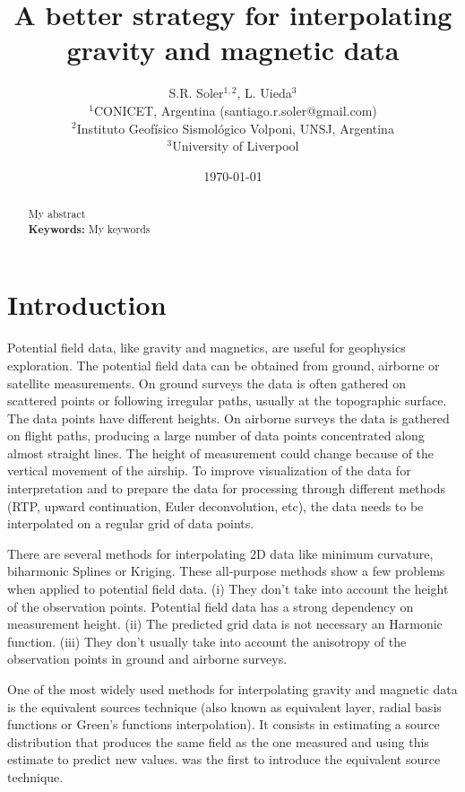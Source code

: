 \documentclass[twocolumn]{article}
\makeatletter
\newcommand{\Title}{A better strategy for interpolating gravity and magnetic data}
\newcommand{\AuthorAffil}{
    {\large
        S.R. Soler$^{1,2}$,
        L. Uieda$^{3}$
    }
    \\[0.4cm]
    {\small $^{1}$CONICET, Argentina (santiago.r.soler@gmail.com)} \\
    {\small $^{2}$Instituto Geofísico Sismológico Volponi, UNSJ, Argentina} \\
    {\small $^{3}$University of Liverpool} \\

}
\makeatother
\begin{document}
\title{\Title}
\author{\AuthorAffil}
\date{
    \normalsize
    \today
}
\maketitle

\begin{abstract}
    My abstract
    \\[0.5cm]
    \textbf{Keywords:}
    My keywords
\end{abstract}


\section{Introduction}

Potential field data, like gravity and magnetics, are useful for geophysics exploration.
The potential field data can be obtained from ground, airborne or satellite
measurements.
On ground surveys the data is often gathered on scattered points or following irregular
paths, usually at the topographic surface.
The data points have different heights.
On airborne surveys the data is gathered on flight paths, producing a large number of
data points concentrated along almost straight lines.
The height of measurement could change because of the vertical movement of the airship.
To improve visualization of the data for interpretation and to prepare the data for
processing through different methods (RTP, upward continuation, Euler deconvolution,
etc), the data needs to be interpolated on a regular grid of data points.

There are several methods for interpolating 2D data like minimum curvature, biharmonic
Splines or Kriging.
These all-purpose methods show a few problems when applied to potential field data.
(i) They don't take into account the height of the observation points. Potential field
data has a strong dependency on measurement height.
(ii) The predicted grid data is not necessary an Harmonic function.
(iii) They don't usually take into account the anisotropy of the observation points in
ground and airborne surveys.

One of the most widely used methods for interpolating gravity and magnetic data is the
equivalent sources technique (also known as equivalent layer, radial basis functions or
Green's functions interpolation).
It consists in estimating a source distribution that produces the same field as the one
measured and using this estimate to predict new values.
\citet{dampney1969} was the first to introduce the equivalent source technique.
\end{document}
